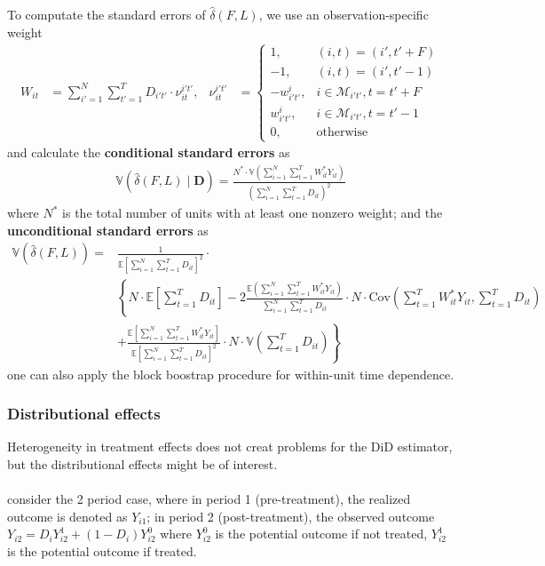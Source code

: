 \documentclass[twoside]{article}
\begin{document}
To computate the standard errors of $\hat{\delta}(F,L)$, we use an observation-specific weight 
\begin{align*}
    W_{it}&= \sum^N_{i'=1}\sum^T_{t'=1} D_{i't'}\cdot \nu^{i't'}_{it}, & \nu^{i't'}_{it}&= \begin{cases}
        1, & (i,t)=(i',t'+F)\\
        -1, & (i,t)=(i',t'-1)\\
        -w^i_{i't'}, & i\in\mathcal{M}_{i't'},t=t'+F\\
        w^i_{i't'}, & i\in\mathcal{M}_{i't'},t=t'-1\\
        0,&\text{otherwise}
    \end{cases}
\end{align*}
and calculate the \textbf{conditional standard errors} as 
\begin{align*}
    \mathbb{V}\left(\hat{\delta}(F,L)\mid \mathbf{D}\right) = \frac{N^* \cdot \mathbb{V}\left( \sum^N_{i=1}\sum^T_{t=1}W^*_{it} Y_{it} \right)}{\left(\sum^N_{i=1}\sum^T_{t=1}D_{it}\right)^2}
\end{align*}
where $N^*$ is the total number of units with at least one nonzero weight; and the \textbf{unconditional standard errors} as
\begin{align*}
    \mathbb{V}\left(\hat{\delta}(F,L)\right) =& \frac{1}{\mathbb{E}\left[\sum^N_{i=1}\sum^T_{t=1}D_{it}\right]^2}\cdot \\
    & \left\{ N\cdot \mathbb{E}\left[\sum^T_{t=1}D_{it}\right] - 2\frac{\mathbb{E}\left(\sum^N_{i=1}\sum^T_{t=1}W^*_{it} Y_{it}\right)}{\sum^N_{i=1}\sum^T_{t=1}D_{it}} \cdot N\cdot \mathrm{Cov}\left(\sum^T_{t=1}W^*_{it} Y_{it},\sum^T_{t=1}D_{it}\right)\right.\\
    & \left. + \frac{\mathbb{E}\left[\sum^N_{i=1}\sum^T_{t=1}W^*_{it} Y_{it}\right]}{\mathbb{E}\left[\sum^N_{i=1}\sum^T_{t=1}D_{it}\right]^2}\cdot N\cdot\mathbb{V}\left(\sum^T_{t=1}D_{it}\right) \right\}
\end{align*}
one can also apply the block boostrap procedure for within-unit time dependence.

\subsubsection{Distributional effects}
Heterogeneity in treatment effects does not creat problems for the DiD estimator, but the distributional effects might be of interest.

\paragraph*{\citet{bonhomme2011recover}} consider the 2 period case, where in period 1 (pre-treatment), the realized outcome is denoted as $Y_{i1}$; in period 2 (post-treatment), the observed outcome $Y_{i2} = D_iY^1_{i2} + (1-D_i)Y^0_{i2}$ where $Y_{i2}^0$ is the potential outcome if not treated, $Y_{i2}^1$ is the potential outcome if treated.
\end{document}
